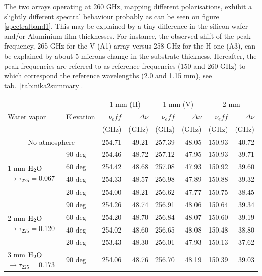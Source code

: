 The two arrays operating at 260 GHz, mapping different polarisations,
exhibit a slightly different spectral behaviour probably as can be
seen on figure \ref{spectralband1}. This may be explained by a tiny
difference in the silicon wafer and/or Aluminium film thicknesses. For
instance, the observed shift of the peak frequency, 265 GHz for the V
(A1) array versus 258 GHz for the H one (A3), can be explained by
about 5 microns change in the substrate thickness. Hereafter, the peak
frequencies are referred to as reference frequencies (150 and 260 GHz)
to which correspond the reference wavelengths (2.0 and 1.15 mm), see
tab.~\ref{tab:nika2summary}.


\begin{table}[th]
\begin{center}
\begin{tabular}{|l|l|r|r|r|r|r|r|}
\hline 
\multirow{3}{*}{Water vapor} & \multirow{3}{*}{Elevation} & \multicolumn{2}{|c|}{1 mm (H)} & \multicolumn{2}{|c|}{1 mm (V)} &
\multicolumn{2}{|c|}{2 mm} \\
 & & $\nu_eff$ & $\Delta \nu$  & $\nu_eff$ & $\Delta \nu$  & $\nu_eff$ & $\Delta \nu$ \\
 & & (GHz) & (GHz)  & (GHz)  & (GHz)   & (GHz)  & (GHz)  \\
\hline
\multicolumn{2}{|c|}{No atmosphere} & 254.71 & 49.21 & 257.39 & 48.05 & 150.93 & 40.72 \\
\hline
\multirow{4}{*}{1 mm $\rm H_2O$ $\rightarrow \tau_{225}=$0.067} & 90 deg &  254.46 & 48.72 & 257.12 & 47.95 & 150.93 & 39.71 \\
 & 60 deg & 254.42 & 48.68 & 257.08 & 47.93 & 150.92 & 39.60 \\
 & 40 deg & 254.33 & 48.57 & 256.98 & 47.89 & 150.88 & 39.32 \\
 & 20 deg & 254.00 & 48.21 & 256.62 & 47.77 & 150.75 & 38.45 \\
\hline
\multirow{4}{*}{2 mm $\rm H_2O$ $\rightarrow \tau_{225}=$0.120} & 90 deg &  254.26 & 48.74 & 256.91 & 48.06 & 150.64 & 39.34 \\
 & 60 deg & 254.20 & 48.70 & 256.84 & 48.07 & 150.60 & 39.19 \\
 & 40 deg & 254.02 & 48.60 & 256.65 & 48.08 & 150.48 & 38.80 \\
 & 20 deg & 253.43 & 48.30 & 256.01 & 47.93 & 150.13 & 37.62 \\
\hline
\multirow{4}{*}{3 mm $\rm H_2O$ $\rightarrow \tau_{225}=$0.173} & 90 deg &  254.06 & 48.76 & 256.70 & 48.19 & 150.39 & 39.03 \\

\end{tabular}
\end{center}
\end{table}
